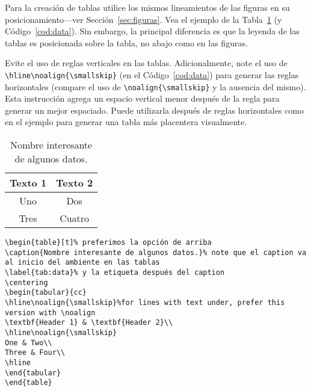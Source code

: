 \documentclass[twocolumn,11pts]{IEEEtran}
\begin{document}
Para la creación de tablas utilice los mismos lineamientos de las figuras en su posicionamiento---ver Sección~\ref{sec:figuras}. Vea el ejemplo de la Tabla~\ref{tab:data} (y Código~\ref{cod:data}). Sin embargo, la principal diferencia es que la leyenda de las tablas es posicionada sobre la tabla, no abajo como en las figuras.

Evite el uso de reglas verticales en las tablas. Adicionalmente, note el uso de \verb|\hline\noalign{\smallskip}| (en el Código~\ref{cod:data}) para generar las reglas horizontales (compare el uso de \verb|\noalign{\smallskip}| y la ausencia del mismo). Esta instrucción agrega un espacio vertical menor después de la regla para generar un mejor espaciado. Puede utilizarla después de reglas horizontales como en el ejemplo para generar una tabla más placentera visualmente.

\begin{table}[t]%
\caption{Nombre interesante de algunos datos.}%
\label{tab:data}%
\centering
\begin{tabular}{cc}
\hline\noalign{\smallskip}%
\textbf{Texto 1} & \textbf{Texto 2}\\
\hline\noalign{\smallskip}
Uno & Dos\\
Tres & Cuatro\\
\hline
\end{tabular}
\end{table}

\begin{lstlisting}[float=tb,caption={Código que produce la Tabla~\ref{tab:data}.},label=cod:data]
\begin{table}[t]% preferimos la opción de arriba
\caption{Nombre interesante de algunos datos.}% note que el caption va al inicio del ambiente en las tablas
\label{tab:data}% y la etiqueta después del caption
\centering
\begin{tabular}{cc}
\hline\noalign{\smallskip}%for lines with text under, prefer this version with \noalign
\textbf{Header 1} & \textbf{Header 2}\\
\hline\noalign{\smallskip}
One & Two\\
Three & Four\\
\hline
\end{tabular}
\end{table}
\end{lstlisting}
\end{document}
